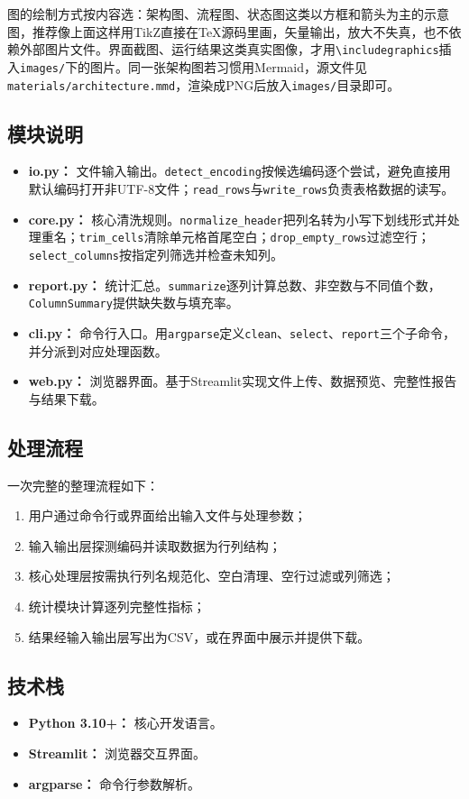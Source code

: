 图的绘制方式按内容选：架构图、流程图、状态图这类以方框和箭头为主的示意图，推荐像上面这样用TikZ直接在\TeX{}源码里画，矢量输出，放大不失真，也不依赖外部图片文件。界面截图、运行结果这类真实图像，才用\lstinline|\includegraphics|插入\lstinline|images/|下的图片。同一张架构图若习惯用Mermaid，源文件见\lstinline|materials/architecture.mmd|，渲染成PNG后放入\lstinline|images/|目录即可。

\subsection{模块说明}
\label{ssec:modules}
\begin{itemize}
    \item \textbf{io.py：} 文件输入输出。\lstinline|detect_encoding|按候选编码逐个尝试，避免直接用默认编码打开非UTF-8文件；\lstinline|read_rows|与\lstinline|write_rows|负责表格数据的读写。
    \item \textbf{core.py：} 核心清洗规则。\lstinline|normalize_header|把列名转为小写下划线形式并处理重名；\lstinline|trim_cells|清除单元格首尾空白；\lstinline|drop_empty_rows|过滤空行；\lstinline|select_columns|按指定列筛选并检查未知列。
    \item \textbf{report.py：} 统计汇总。\lstinline|summarize|逐列计算总数、非空数与不同值个数，\lstinline|ColumnSummary|提供缺失数与填充率。
    \item \textbf{cli.py：} 命令行入口。用\lstinline|argparse|定义\lstinline|clean|、\lstinline|select|、\lstinline|report|三个子命令，并分派到对应处理函数。
    \item \textbf{web.py：} 浏览器界面。基于Streamlit实现文件上传、数据预览、完整性报告与结果下载。
\end{itemize}

\subsection{处理流程}
\label{ssec:arch_flow}
一次完整的整理流程如下：
\begin{enumerate}
    \item 用户通过命令行或界面给出输入文件与处理参数；
    \item 输入输出层探测编码并读取数据为行列结构；
    \item 核心处理层按需执行列名规范化、空白清理、空行过滤或列筛选；
    \item 统计模块计算逐列完整性指标；
    \item 结果经输入输出层写出为CSV，或在界面中展示并提供下载。
\end{enumerate}

\subsection{技术栈}
\label{ssec:tech_stack}
\begin{itemize}
    \item \textbf{Python 3.10+：} 核心开发语言。
    \item \textbf{Streamlit：} 浏览器交互界面。
    \item \textbf{argparse：} 命令行参数解析。
\end{itemize}

